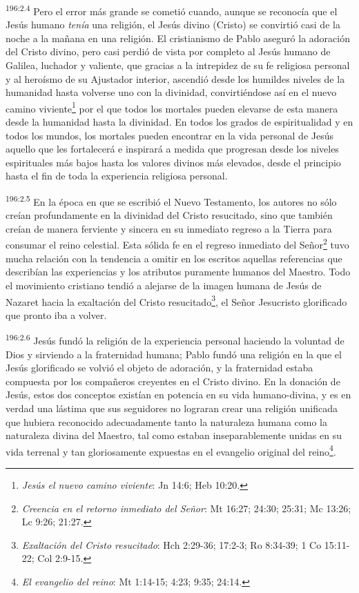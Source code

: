 \par
\textsuperscript{196:2.4} Pero el error más grande se cometió cuando, aunque se reconocía que el Jesús humano \textit{tenía} una religión, el Jesús divino (Cristo) se convirtió casi de la noche a la mañana en una religión. El cristianismo de Pablo aseguró la adoración del Cristo divino, pero casi perdió de vista por completo al Jesús humano de Galilea, luchador y valiente, que gracias a la intrepidez de su fe religiosa personal y al heroísmo de su Ajustador interior, ascendió desde los humildes niveles de la humanidad hasta volverse uno con la divinidad, convirtiéndose así en el nuevo camino viviente\footnote{\textit{Jesús el nuevo camino viviente}: Jn 14:6; Heb 10:20.} por el que todos los mortales pueden elevarse de esta manera desde la humanidad hasta la divinidad. En todos los grados de espiritualidad y en todos los mundos, los mortales pueden encontrar en la vida personal de Jesús aquello que les fortalecerá e inspirará a medida que progresan desde los niveles espirituales más bajos hasta los valores divinos más elevados, desde el principio hasta el fin de toda la experiencia religiosa personal.

\par
\textsuperscript{196:2.5} En la época en que se escribió el Nuevo Testamento, los autores no sólo creían profundamente en la divinidad del Cristo resucitado, sino que también creían de manera ferviente y sincera en su inmediato regreso a la Tierra para consumar el reino celestial. Esta sólida fe en el regreso inmediato del Señor\footnote{\textit{Creencia en el retorno inmediato del Señor}: Mt 16:27; 24:30; 25:31; Mc 13:26; Lc 9:26; 21:27.} tuvo mucha relación con la tendencia a omitir en los escritos aquellas referencias que describían las experiencias y los atributos puramente humanos del Maestro. Todo el movimiento cristiano tendió a alejarse de la imagen humana de Jesús de Nazaret hacia la exaltación del Cristo resucitado\footnote{\textit{Exaltación del Cristo resucitado}: Hch 2:29-36; 17:2-3; Ro 8:34-39; 1 Co 15:11-22; Col 2:9-15.}, el Señor Jesucristo glorificado que pronto iba a volver.

\par
\textsuperscript{196:2.6} Jesús fundó la religión de la experiencia personal haciendo la voluntad de Dios y sirviendo a la fraternidad humana; Pablo fundó una religión en la que el Jesús glorificado se volvió el objeto de adoración, y la fraternidad estaba compuesta por los compañeros creyentes en el Cristo divino. En la donación de Jesús, estos dos conceptos existían en potencia en su vida humano-divina, y es en verdad una lástima que sus seguidores no lograran crear una religión unificada que hubiera reconocido adecuadamente tanto la naturaleza humana como la naturaleza divina del Maestro, tal como estaban inseparablemente unidas en su vida terrenal y tan gloriosamente expuestas en el evangelio original del reino\footnote{\textit{El evangelio del reino}: Mt 1:14-15; 4:23; 9:35; 24:14.}.

